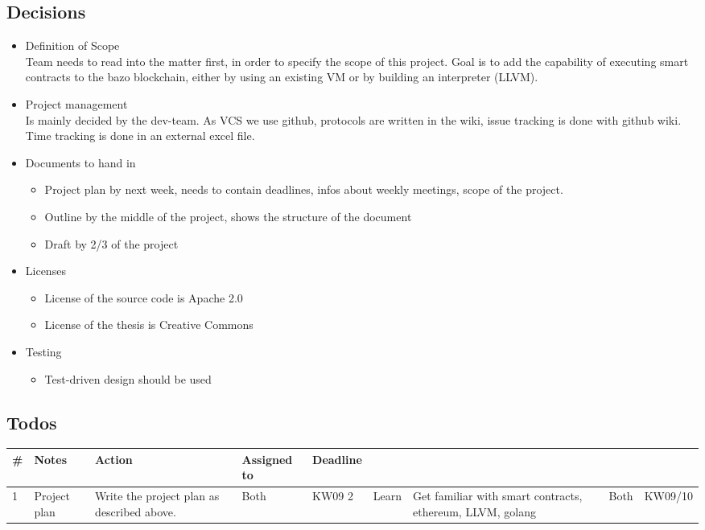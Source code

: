 \subsection{Decisions}
\begin{itemize}
\item
  Definition of Scope\\
  Team needs to read into the matter first, in order to specify the
  scope of this project. Goal is to add the capability of executing
  smart contracts to the bazo blockchain, either by using an existing VM
  or by building an interpreter (LLVM).
\item
  Project management\\
  Is mainly decided by the dev-team. As VCS we use github, protocols are
  written in the wiki, issue tracking is done with github wiki. Time
  tracking is done in an external excel file.
\item
  Documents to hand in

  \begin{itemize}
  \item
    Project plan by next week, needs to contain deadlines, infos about
    weekly meetings, scope of the project.
  \item
    Outline by the middle of the project, shows the structure of the
    document
  \item
    Draft by 2/3 of the project
  \end{itemize}
\item
  Licenses

  \begin{itemize}
  \item
    License of the source code is Apache 2.0
  \item
    License of the thesis is Creative Commons
  \end{itemize}
\item
  Testing

  \begin{itemize}
  \item
    Test-driven design should be used
  \end{itemize}
\end{itemize}

\subsection{Todos}
\begin{table}[H]
\centering
\begin{tabular}{L{1cm} L{3cm} L{6cm} L{1.5cm} R{1.5cm} R{1cm}}
\toprule
\# & Notes               & Action                                                                             & Assigned to & Deadline \\  & Project plan & Write the project plan as described above.                & Both & KW09    
2 & Learn        & Get familiar with smart contracts, ethereum, LLVM, golang & Both & KW09/10 \\ \bottomrule
\end{tabular}
\end{table}